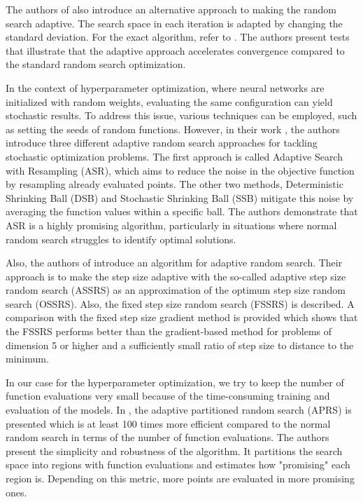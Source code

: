 The authors of \cite{MASRI1980353} also introduce an alternative approach to making the random search adaptive. The search space in each iteration is adapted by changing the standard deviation. For the exact algorithm, refer to \cite{MASRI1980353}. The authors present tests that illustrate that the adaptive approach accelerates convergence compared to the standard random search optimization. \newline 

In the context of hyperparameter optimization, where neural networks are initialized with random weights, evaluating the same configuration can yield stochastic results. To address this issue, various techniques can be employed, such as setting the seeds of random functions. However, in their work \cite{random_search_2}, the authors introduce three different adaptive random search approaches for tackling stochastic optimization problems. The first approach is called Adaptive Search with Resampling (ASR), which aims to reduce the noise in the objective function by resampling already evaluated points. The other two methods, Deterministic Shrinking Ball (DSB) and Stochastic Shrinking Ball (SSB) mitigate this noise by averaging the function values within a specific ball. The authors demonstrate that ASR is a highly promising algorithm, particularly in situations where normal random search struggles to identify optimal solutions. \newline

Also, the authors of \cite{schumer1968adaptive} introduce an algorithm for adaptive random search. Their approach is to make the step size adaptive with the so-called adaptive step size random search (ASSRS) as an approximation of the optimum step size random search (OSSRS). Also, the fixed step size random search (FSSRS) is described. A comparison with the fixed step size gradient method is provided which shows that the FSSRS performs better than the gradient-based method for problems of dimension 5 or higher and a sufficiently small ratio of step size to distance to the minimum. \newline 

In our case for the hyperparameter optimization, we try to keep the number of function evaluations very small because of the time-consuming training and evaluation of the models. In \cite{tang1994adaptive}, the adaptive partitioned random search (APRS) is presented which is at least 100 times more efficient compared to the normal random search in terms of the number of function evaluations. The authors present the simplicity and robustness of the algorithm. It partitions the search space into regions with function evaluations and estimates how "promising" each region is. Depending on this metric, more points are evaluated in more promising ones. \newline 

